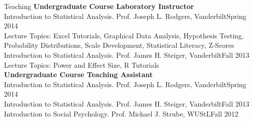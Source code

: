 \documentclass {resume}
\begin{document}

\begin{rSection}{\textrm{Teaching
}}
{\large {\bf Undergraduate Course Laboratory Instructor}\\}
Introduction to Statistical Analysis. Prof. Joseph L. Rodgers, Vanderbilt\hfill  {Spring 2014}\\
\hspace* {6 mm}Lecture Topics: Excel Tutorials, Graphical Data Analysis, Hypothesis Testing,\\
\hspace* {6 mm}Probability Distributions, Scale Development, Statistical Literacy, Z-Scores%
\smallskip\\
Introduction to Statistical Analysis. Prof. James H. Steiger, Vanderbilt\hfill  {Fall 2013}\\
\hspace* {6 mm}Lecture Topics: Power and Effect Size, R Tutorials\medskip\\
{\large {\bf Undergraduate Course Teaching Assistant}}\\
Introduction to Statistical Analysis. Prof. Joseph L. Rodgers, Vanderbilt\hfill  {Spring 2014}\smallskip\\
Introduction to Statistical Analysis. Prof. James H. Steiger, Vanderbilt\hfill  {Fall 2013}\smallskip\\
Introduction to Social Psychology. Prof. Michael J. Strube, WUStL\hfill  {Fall 2012}
\end{rSection}
\end{document}
